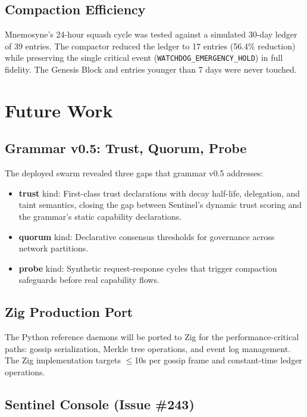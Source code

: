 \documentclass[conference]{IEEEtran}
\begin{document}
\subsection{Compaction Efficiency}

Mnemosyne's 24-hour squash cycle was tested against a simulated 30-day ledger
of 39 entries. The compactor reduced the ledger to 17 entries (56.4\%
reduction) while preserving the single critical event
(\texttt{WATCHDOG\_EMERGENCY\_HOLD}) in full fidelity. The Genesis Block and
entries younger than 7 days were never touched.

\section{Future Work}

\subsection{Grammar v0.5: Trust, Quorum, Probe}

The deployed swarm revealed three gaps that grammar v0.5 addresses:

\begin{itemize}
\item \textbf{trust} kind: First-class trust declarations with decay half-life,
delegation, and taint semantics, closing the gap between Sentinel's dynamic
trust scoring and the grammar's static capability declarations.
\item \textbf{quorum} kind: Declarative consensus thresholds for governance
across network partitions.
\item \textbf{probe} kind: Synthetic request-response cycles that trigger
compaction safeguards before real capability flows.
\end{itemize}

\subsection{Zig Production Port}

The Python reference daemons will be ported to Zig for the performance-critical
paths: gossip serialization, Merkle tree operations, and event log management.
The Zig implementation targets $\leq$10\textmu s per gossip frame and
constant-time ledger operations.

\subsection{Sentinel Console (Issue \#243)}
\end{document}
